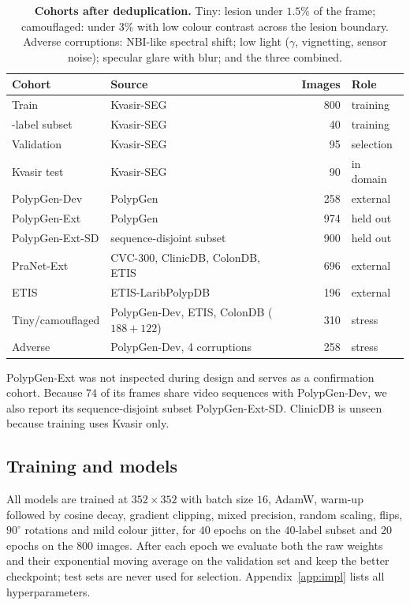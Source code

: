 \documentclass[10pt,twocolumn]{article}
\begin{document}
\begin{table}[!t]
  \centering
  \caption{\textbf{Cohorts after deduplication.} Tiny: lesion under $1.5\%$ of the frame; camouflaged: under $3\%$ with low colour contrast across the lesion boundary. Adverse corruptions: NBI-like spectral shift; low light ($\gamma$, vignetting, sensor noise); specular glare with blur; and the three combined.}
  \label{tab:data}
  \vspace{2pt}
  \setlength{\tabcolsep}{3pt}\footnotesize
  \begin{tabular}{@{}p{} p{} r l@{}}
    \toprule
    \textbf{Cohort} & \textbf{Source} & \textbf{Images} & \textbf{Role} \\
    \midrule
    Train & Kvasir-SEG~\citep{jha2020kvasir} & 800 & training \\
    \quad 40-label subset & Kvasir-SEG & 40 & training \\
    Validation & Kvasir-SEG & 95 & selection \\
    Kvasir test & Kvasir-SEG & 90 & in domain \\
    PolypGen-Dev & PolypGen~\citep{ali2023polypgen} & 258 & external \\
    PolypGen-Ext & PolypGen & 974 & held out \\
    \quad PolypGen-Ext-SD & sequence-disjoint subset & 900 & held out \\
    PraNet-Ext & CVC-300, ClinicDB, ColonDB, ETIS~\citep{fan2020pranet} & 696 & external \\
    \quad ETIS & ETIS-LaribPolypDB & 196 & external \\
    Tiny/camouflaged & PolypGen-Dev, ETIS, ColonDB ($188+122$) & 310 & stress \\
    Adverse & PolypGen-Dev, 4 corruptions & 258 & stress \\
    \bottomrule
  \end{tabular}
\end{table}

PolypGen-Ext was not inspected during design and serves as a confirmation cohort. Because $74$ of its frames share video sequences with PolypGen-Dev, we also report its sequence-disjoint subset PolypGen-Ext-SD. ClinicDB is unseen because training uses Kvasir only.

\subsection{Training and models}
All models are trained at $352\times352$ with batch size $16$, AdamW, warm-up followed by cosine decay, gradient clipping, mixed precision, random scaling, flips, $90^\circ$ rotations and mild colour jitter, for $40$ epochs on the $40$-label subset and $20$ epochs on the $800$ images. After each epoch we evaluate both the raw weights and their exponential moving average on the validation set and keep the better checkpoint; test sets are never used for selection. Appendix~\ref{app:impl} lists all hyperparameters.
\end{document}
